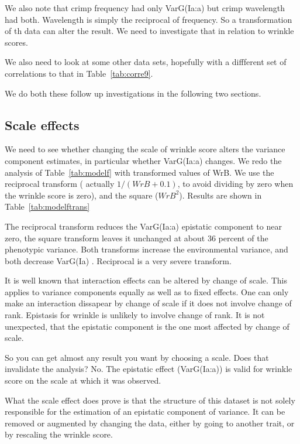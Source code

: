 \documentclass[titlepage]{article}  %
\begin{document}
We also note that crimp frequency had only VarG(Ia:a) but crimp wavelength had both. Wavelength is simply the reciprocal of frequency. So a transformation of th data can alter the result. We need to investigate that in relation to wrinkle scores. 

We also need to look at some other data sets, hopefully with a diffferent set of correlations to that in Table~\ref{tab:corre9}.
 
We do both these follow up investigations in the following two sections.

\subsection{Scale effects}
We need to see whether changing the scale of wrinkle score alters the variance component estimates, in particular whether VarG(Ia:a) changes. We redo the analysis of Table~\ref{tab:modelf} with transformed values of WrB. We use the reciprocal transform ( actually $1/(WrB + 0.1)$, to avoid dividing by zero when the wrinkle score is zero), and the square ($WrB^{2}$). Results are shown in Table~\ref{tab:modelftrans}

The reciprocal transform reduces the VarG(Ia:a) epistatic component to near zero, the square transform leaves it unchanged at about 36 percent of the phenotypic variance.  Both transforms increase the environmental variance, and both decrease VarG(Ia) .  Reciprocal is a very severe transform.

It is well known that interaction effects can be altered by change of scale. This applies to variance components equally as well as to fixed effects. One can only make an interaction dissapear by change of scale if it does not involve change of rank. Epistasis for wrinkle is unlikely to involve change of rank. It is not unexpected, that the epistatic component is the one most affected by change of scale. 

So you can get  almost any result you want by choosing a scale. Does that invalidate the analysis? No. The epistatic effect (VarG(Ia:a)) is valid for wrinkle score on the scale at which it was observed.  

What the scale effect does prove is that the structure of this dataset is not solely responsible for the estimation of an epistatic component of variance. It can be removed or augmented by changing the data, either by going to another trait, or by rescaling the wrinkle score.
\end{document}

